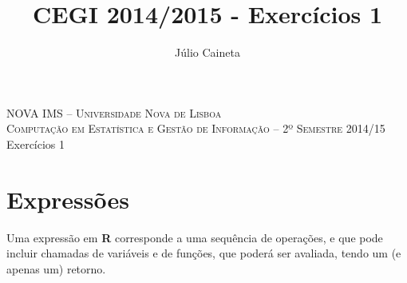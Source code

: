 \documentclass{exam}
\author{Júlio Caineta}
\title{CEGI 2014/2015 - Exercícios 1}
\begin{document}
 
\begin{center}
\textsc {\small NOVA IMS -- Universidade Nova de Lisboa} \\
\textsc {Computação em Estatística e Gestão de Informação -- 2º Semestre 2014/15}
\vspace{5mm} \\
{\large Exercícios 1}
\end{center}
 
\vspace{5mm}

\section{Expressões}
Uma expressão em \textbf{R} corresponde a uma sequência de operações, e que pode incluir chamadas de variáveis e de funções, que poderá ser avaliada, tendo um (e apenas um) retorno.
 
\end{document}
